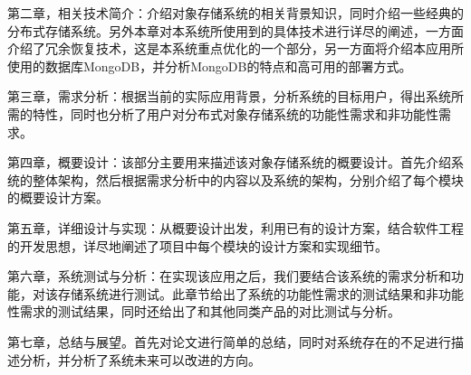 第二章，相关技术简介：介绍对象存储系统的相关背景知识，同时介绍一些经典的分布式存储系统。另外本章对本系统所使用到的具体技术进行详尽的阐述，一方面介绍了冗余恢复技术，这是本系统重点优化的一个部分，另一方面将介绍本应用所使用的数据库MongoDB，并分析MongoDB的特点和高可用的部署方式。 

第三章，需求分析：根据当前的实际应用背景，分析系统的目标用户，得出系统所需的特性，同时也分析了用户对分布式对象存储系统的功能性需求和非功能性需求。

第四章，概要设计：该部分主要用来描述该对象存储系统的概要设计。首先介绍系统的整体架构，然后根据需求分析中的内容以及系统的架构，分别介绍了每个模块的概要设计方案。

第五章，详细设计与实现：从概要设计出发，利用已有的设计方案，结合软件工程的开发思想，详尽地阐述了项目中每个模块的设计方案和实现细节。

第六章，系统测试与分析：在实现该应用之后，我们要结合该系统的需求分析和功能，对该存储系统进行测试。此章节给出了系统的功能性需求的测试结果和非功能性需求的测试结果，同时还给出了和其他同类产品的对比测试与分析。

第七章，总结与展望。首先对论文进行简单的总结，同时对系统存在的不足进行描述分析，并分析了系统未来可以改进的方向。